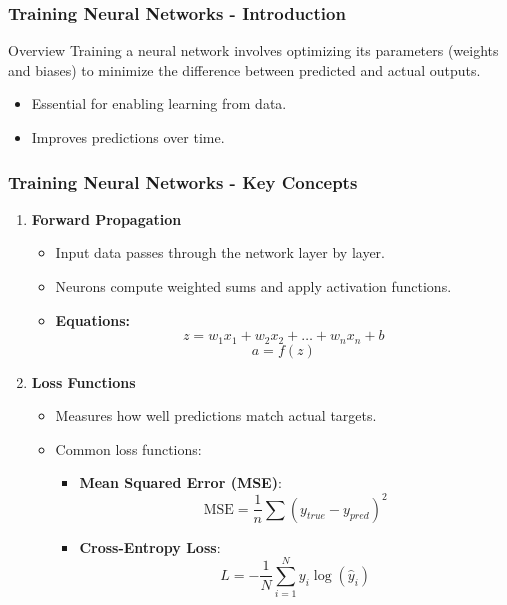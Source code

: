 \documentclass[aspectratio=169]{beamer}
\begin{document}
\begin{frame}[fragile]
    \frametitle{Training Neural Networks - Introduction}
    \begin{block}{Overview}
        Training a neural network involves optimizing its parameters (weights and biases) to minimize the difference between predicted and actual outputs.
    \end{block}
    \begin{itemize}
        \item Essential for enabling learning from data.
        \item Improves predictions over time.
    \end{itemize}
\end{frame}

\begin{frame}[fragile]
    \frametitle{Training Neural Networks - Key Concepts}
    \begin{enumerate}
        \item \textbf{Forward Propagation}
        \begin{itemize}
            \item Input data passes through the network layer by layer.
            \item Neurons compute weighted sums and apply activation functions. 
            \item \textbf{Equations:}
            \begin{equation}
                z = w_1 x_1 + w_2 x_2 + \ldots + w_n x_n + b
            \end{equation}
            \begin{equation}
                a = f(z)
            \end{equation}
        \end{itemize}
        
        \item \textbf{Loss Functions}
        \begin{itemize}
            \item Measures how well predictions match actual targets.
            \item Common loss functions:
            \begin{itemize}
                \item \textbf{Mean Squared Error (MSE)}:
                \begin{equation}
                    \text{MSE} = \frac{1}{n} \sum (y_{true} - y_{pred})^2
                \end{equation}
                \item \textbf{Cross-Entropy Loss}:
                \begin{equation}
                    L = -\frac{1}{N} \sum_{i=1}^{N} y_i \log(\hat{y}_i)
                \end{equation}
            \end{itemize}
        \end{itemize}
    \end{enumerate}
\end{frame}
\end{document}
